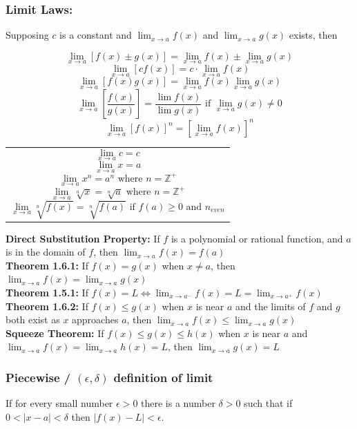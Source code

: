 \documentclass[12pt]{article}
\begin{document}
\subsubsection{Limit Laws:}
Supposing $c$ is a constant and $\lim_{x \to a}f(x)$ and $\lim_{x \to a}g(x)$ exists, then\\
\begin{minipage}{0.5\textwidth}
    $$\lim_{x \to a} [f(x) \pm g(x)] = \lim_{x \to a} f(x) \pm \lim_{x \to a} g(x)$$
    $$\lim_{x \to a} [cf(x)] = c \cdot \lim_{x \to a} f(x)$$
    $$\lim_{x \to a} [f(x)g(x)] = \lim_{x \to a} f(x) \lim_{x \to a} g(x)$$
    $$\lim_{x \to a} \left [ \frac{f(x)}{g(x)} \right ] = \frac{\lim f(x)}{\lim g(x)} \text{ if } \lim_{x \to a} g(x) \neq{} 0$$
    $$\lim_{x \to a} [f(x)]^n = [\lim_{x \to a} f(x)]^n$$

\hfill
\end{minipage}
\begin{minipage}{0.45\textwidth}
\begin{tabular}{|p{\textwidth}}
$$\lim_{x \to a} c = c$$
$$\lim_{x \to a} x = a$$
$$\lim_{x \to a} x^n = a^n \text{ where } n = \mathbb{Z}^+$$ 
$$\lim_{x \to a} \sqrt[n]{x} = \sqrt[n]{a} \text{ where } n = \mathbb{Z}^+$$ 
$$\lim_{x \to a} \sqrt[n]{f(x)} = \sqrt[n]{f(a)} \text{ if } f(a) \geq 0 \text{ and } n_{even}$$
\end{tabular}
\end{minipage}

\noindent\textbf{Direct Substitution Property:} If $f$ is a polynomial or rational function, and $a$ is in the domain of $f$, then $\lim_{x \to a} f(x) = f(a)$\\
\textbf{Theorem 1.6.1:} If $f(x) = g(x)$ when $x \neq a$, then $\lim_{x\to a} f(x) = \lim_{x\to a} g(x)$ \\
\textbf{Theorem 1.5.1:} If $f(x) = L \iff \lim_{x\to a^-} f(x) = L = \lim_{x\to a^+} f(x)$\\
\textbf{Theorem 1.6.2:} If $f(x) \leq g(x)$ when $x$ is near $a$ and the limits of $f$ and $g$ both exist as $x$ approaches $a$, then $\lim_{x\to a} f(x) \leq \lim_{x\to a} g(x)$\\
\textbf{Squeeze Theorem:} If $f(x) \leq g(x) \leq h(x)$ when $x$ is near $a$ and 
 $\lim_{x\to a} f(x) =  \lim_{x\to a} h(x) = L$, then $\lim_{x\to a} g(x) = L$


\subsubsection{Piecewise / $(\epsilon, \delta)$ definition  of limit}
If for every small number $\epsilon >  0$ there is a number $\delta > 0$ such that if $0 < |x-a| < \delta$ then $|f(x) - L| < \epsilon$.
\end{document}
